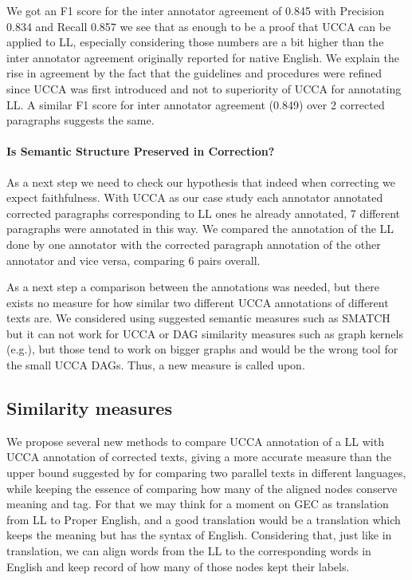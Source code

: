 \documentclass[english]{article}
\begin{document}
We got an F1 score for the inter annotator agreement of 0.845 with
Precision 0.834 and Recall 0.857 we see that as enough to be a proof
that UCCA can be applied to LL, especially considering those numbers
are a bit higher than the inter annotator agreement originally reported
for native English\cite{abend2013universal}.
We explain the rise in agreement by the fact that the guidelines and
procedures were refined since UCCA was first introduced and not to
superiority of UCCA for annotating LL. A similar F1
score for inter annotator agreement (0.849) over 2 corrected paragraphs
suggests the same.

\paragraph{Is Semantic Structure Preserved in Correction?}

As a next step we need to check our hypothesis that indeed when correcting we
expect faithfulness. With UCCA as our case study each annotator annotated
corrected paragraphs corresponding to LL ones he already annotated,
7 different paragraphs were annotated in this way. 
We compared the annotation of the LL done by one annotator
with the corrected
paragraph annotation of the other annotator and vice versa, comparing 6 pairs overall. 

As a next step a comparison between the annotations was needed, but
there exists no measure for how similar two different UCCA annotations
of different texts are. We considered using suggested semantic measures
such as SMATCH\cite{cai2013smatch} but it can not work for UCCA or
DAG similarity measures such as graph kernels (e.g.\cite{kashima2003marginalized}),
but those tend to work on bigger graphs and would be the wrong tool
for the small UCCA DAGs. Thus, a new measure is called upon.

\subsection{Similarity measures\label{subsec:Similarity-measures}}

We propose several new methods to compare UCCA annotation of a LL with UCCA annotation of corrected texts, giving a more accurate
measure than the upper bound suggested by \cite{sulem2015conceptual}for
comparing two parallel texts in different languages, while keeping
the essence of comparing how many of the aligned nodes conserve meaning
and tag. For that we may think for a moment on GEC as
translation from LL to Proper English, and a good translation
would be a translation which keeps the meaning but has the syntax
of English. Considering that, just like in translation, we can align
words from the LL to the corresponding words in English
and keep record of how many of those nodes kept their labels.
\end{document}
